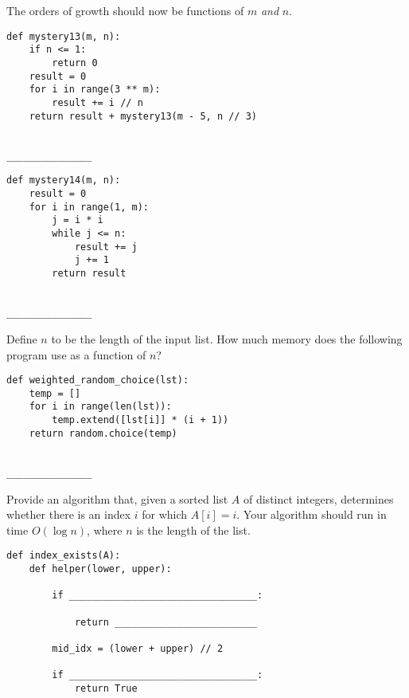 \documentclass[twoside]{article}
\begin{document}
\begin{enumerate}

The orders of growth should now be functions of $m$ \emph{and} $n$.

\begin{lstlisting}
def mystery13(m, n):
    if n <= 1:
        return 0
    result = 0
    for i in range(3 ** m):
        result += i // n
    return result + mystery13(m - 5, n // 3)
\end{lstlisting}
~\\
\lstinline{_______________}

\begin{lstlisting}
def mystery14(m, n):
    result = 0
    for i in range(1, m):
        j = i * i
        while j <= n:
            result += j
            j += 1
        return result
\end{lstlisting}
~\\
\lstinline{_______________}

\newpage


Define $n$ to be the length of the input list. How much memory does the following program use as a function of $n$?

\begin{lstlisting}
def weighted_random_choice(lst):
    temp = []
    for i in range(len(lst)):
        temp.extend([lst[i]] * (i + 1))
    return random.choice(temp)
\end{lstlisting}
~\\
\lstinline{_______________}


Provide an algorithm that, given a sorted list $A$ of distinct integers, determines whether there is an index $i$ for which $A[i] = i$. Your algorithm should run in time $O(\log{n})$, where $n$ is the length of the list.

\begin{lstlisting}
def index_exists(A):
    def helper(lower, upper):
    
        if _________________________________:
        
            return _________________________
            
        mid_idx = (lower + upper) // 2
        
        if _________________________________:
            return True
            

\end{lstlisting}
\end{enumerate}
\end{document}
